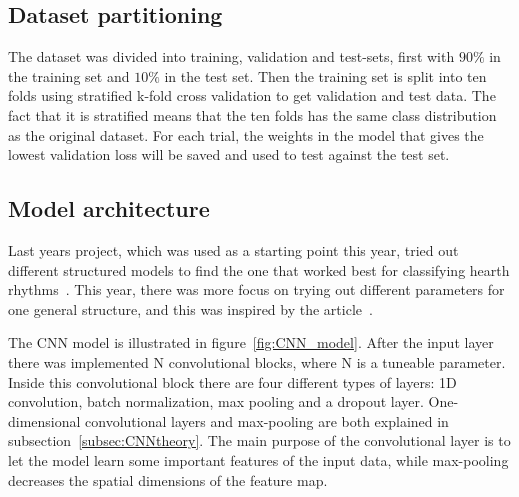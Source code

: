 \subsection{Dataset partitioning}
The dataset was divided into training, validation and test-sets, first with $90\%$ in the training set and $10\%$ in the test set. Then the training set is split into ten folds using stratified k-fold cross validation to get validation and test data. The fact that it is stratified means that the ten folds has the same class distribution as the original dataset. For each trial, the weights in the model that gives the lowest validation loss will be saved and used to test against the test set.


\subsection{Model architecture}\label{subsec:modelarch}

Last years project, which was used as a starting point this year, tried out different structured models to find the one that worked best for classifying hearth rhythms~\cite{cardiac}. This year, there was more focus on trying out different parameters for one general structure, and this was inspired by the article~\cite{2020}. 

The CNN model is illustrated in figure~\ref{fig:CNN_model}. After the input layer there was implemented N convolutional blocks, where N is a tuneable parameter. Inside this convolutional block there are four different types of layers: 1D convolution, batch normalization, max pooling and a dropout layer. One-dimensional convolutional layers and max-pooling are both explained in subsection~\ref{subsec:CNNtheory}. The main purpose of the convolutional layer is to let the model learn some important features of the input data, while max-pooling decreases the spatial dimensions of the feature map.


